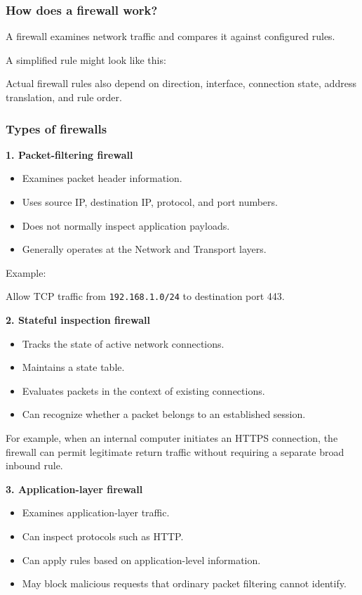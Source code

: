 \subsubsection{How does a firewall work?}

A firewall examines network traffic and compares it against configured rules.

A simplified rule might look like this:


Actual firewall rules also depend on direction, interface, connection state, address translation, and rule order.

\subsubsection{Types of firewalls}

\textbf{1. Packet-filtering firewall}

\begin{itemize}
\item Examines packet header information.
\item Uses source IP, destination IP, protocol, and port numbers.
\item Does not normally inspect application payloads.
\item Generally operates at the Network and Transport layers.
\end{itemize}

Example:

Allow TCP traffic from \texttt{192.168.1.0/24} to destination port 443.

\textbf{2. Stateful inspection firewall}

\begin{itemize}
\item Tracks the state of active network connections.
\item Maintains a state table.
\item Evaluates packets in the context of existing connections.
\item Can recognize whether a packet belongs to an established session.
\end{itemize}

For example, when an internal computer initiates an HTTPS connection, the firewall can permit legitimate return traffic without requiring a separate broad inbound rule.

\textbf{3. Application-layer firewall}

\begin{itemize}
\item Examines application-layer traffic.
\item Can inspect protocols such as HTTP.
\item Can apply rules based on application-level information.
\item May block malicious requests that ordinary packet filtering cannot identify.
\end{itemize}

